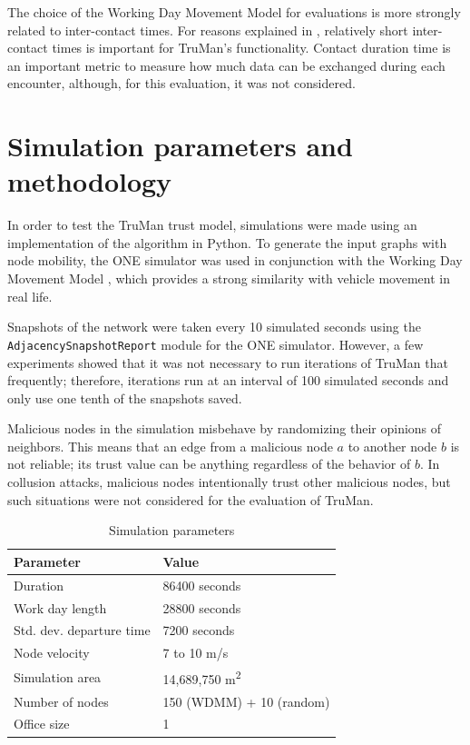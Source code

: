 The choice of the Working Day Movement Model for evaluations is more strongly related to inter-contact times.
For reasons explained in , relatively short inter-contact times is important for TruMan's functionality.
Contact duration time is an important metric to measure how much data can be exchanged during each encounter, although, for this evaluation, it was not considered.

\section{Simulation parameters and methodology}
\label{section:parameters}

In order to test the TruMan trust model, simulations were made using an implementation of the algorithm in Python.
To generate the input graphs with node mobility, the ONE simulator \citep{keranen2009one} was used in conjunction with the Working Day Movement Model \citep{ekman2008working}, which provides a strong similarity with vehicle movement in real life.

Snapshots of the network were taken every 10 simulated seconds using the \texttt{AdjacencySnapshotReport} module for the ONE simulator.
However, a few experiments showed that it was not necessary to run iterations of TruMan that frequently; therefore, iterations run at an interval of 100 simulated seconds and only use one tenth of the snapshots saved.

Malicious nodes in the simulation misbehave by randomizing their opinions of neighbors.
This means that an edge from a malicious node $a$ to another node $b$ is not reliable; its trust value can be anything regardless of the behavior of $b$.
In collusion attacks, malicious nodes intentionally trust other malicious nodes, but such situations were not considered for the evaluation of TruMan.

\begin{table}[h!]
\caption{Simulation parameters}
\label{table:parameters}
\centering
\begin{tabular}{|p{5cm}||p{5cm}|}
 \hline
 \textbf{Parameter}	& \textbf{Value} \\
 \hline
 \hline
 Duration 			& 86400 seconds \\
 \hline
 Work day length 	& 28800 seconds \\
 \hline
 Std. dev. departure time & 7200 seconds \\
 \hline
 Node velocity 		& 7 to 10 m/s \\
 \hline
 Simulation area	& 14,689,750 m\textsuperscript{2} \\
 \hline
 Number of nodes 	& 150 (WDMM) + 10 (random) \\
 \hline
 Office size 		& 1 \\
 \hline
\end{tabular}
\end{table}

